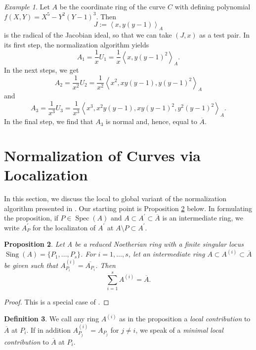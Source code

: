 \documentclass[a4paper,11pt]{amsart}%
\theoremstyle{definition}
\newtheorem{defn}{Definition}[section]
\theoremstyle{plain}
\newtheorem{proposition}[defn]{Proposition}
\theoremstyle{remark}
\newtheorem{example}[defn]{Example}
\DeclareMathOperator{\Spec}{Spec}
\DeclareMathOperator{\Sing}{Sing}
\begin{document}
\begin{example}
\label{example:the global algorithm} Let $A$ be the coordinate ring of the
curve $C$ with defining polynomial $f(X,Y)=X^{5} -Y^{2}(Y-1)^{3}$. Then
\[
J:=\left\langle x, y\left(  y-1\right)  \right\rangle _{A}
\]
is the radical of the Jacobian ideal, so that we can take $(J,x)$ as a test
pair. In its first step, the normalization algorithm yields
\[
A_{1}=\frac{1}{x}U_{1}=\frac{1}{x}\left\langle x,y(y-1)^{2}\right\rangle _{A}
\text{.}%
\]
In the next steps, we get
\[
A_{2}=\frac{1}{x^{2}}U_{2}=\frac{1}{x^{2}}\left\langle x^{2}%
,xy(y-1),y(y-1)^{2}\right\rangle _{A}%
\]
and%
\[
A_{3}=\frac{1}{x^{3}}U_{3}=\frac{1}{x^{3}}\left\langle x^{3},x^{2}%
y(y-1),xy(y-1)^{2},y^{2}(y-1)^{2}\right\rangle _{A}\text{.}%
\]
In the final step, we find that $A_{3}$ is normal and, hence, equal to
$\overline{A}$.
\end{example}

\section{Normalization of Curves via Localization}

\label{sect:noem-via-loc}

In this section, we discuss the local to global variant of the normalization 
algorithm presented in \cite{BDLPSS}. Our starting point is Proposition 
\ref{prop:local-to-global} below. In formulating the proposition,
if $P\in\Spec(A)$ and $A\subset A^{\prime}\subset\overline{A}$ is an 
intermediate ring, we write $A^{\prime}_P$ for the localizaton of 
$A^{\prime}$ at $A\setminus P\subset A^{\prime}$.

\begin{proposition}
\label{prop:local-to-global} 
Let A be a reduced Noetherian ring with a finite singular locus 
$\Sing(A)=\{P_{1},\dots,P_{s}\}$. For $i=1,\dots,s$, let an intermediate
ring $A\subset A^{(i)}\subset\overline{A}$ be given such that 
$A^{(i)}_{P_i}=\overline{A _{P_i}}$. Then
\[
\sum_{i=1}^{s}A^{(i)}=\overline{A}.
\]
\end{proposition}

\begin{proof}
This is a special case of \cite[Proposition 3.2]{BDLPSS}.
\end{proof}

\begin{defn}
We call any ring $A^{(i)}$ as in the proposition a \emph{local contribution}
to $\overline{A}$ at $P_{i}$. If in addition $A^{(i)}_{P_j}={A _{P_j}}$
for $j\neq i$, we speak of a \emph{minimal local contribution} to
$\overline{A}$ at $P_{i}$.
\end{defn}
\end{document}

